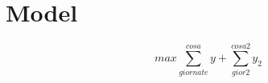 \documentclass[a4paper,10pt]{article}
\theoremstyle{definition}
\theoremstyle{plain}
\begin{document}
	
\section{Model}

\begin{equation}
	max \sum_{giornate}^{cosa} y + \sum_{gior2}^{cosa2} y_2
\end{equation}

	
	
	
	
\end{document}
